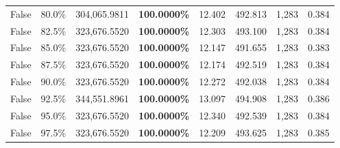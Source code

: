 \begin{table}[H]
\begin{tabular}{lllrllll}
\cline{1-8}
False & 80.0\% & \color{red} 304,065.9811 & \bfseries \color{red} 100.0000\% & 12.402 & 492.813 & 1,283 & 0.384 \\
\cline{1-8}
False & 82.5\% & 323,676.5520 & \bfseries \color{red} 100.0000\% & 12.303 & 493.100 & 1,283 & 0.384 \\
\cline{1-8}
False & 85.0\% & 323,676.5520 & \bfseries \color{red} 100.0000\% & 12.147 & 491.655 & 1,283 & 0.383 \\
\cline{1-8}
False & 87.5\% & 323,676.5520 & \bfseries \color{red} 100.0000\% & 12.174 & 492.519 & 1,283 & 0.384 \\
\cline{1-8}
False & 90.0\% & 323,676.5520 & \bfseries \color{red} 100.0000\% & 12.272 & 492.038 & 1,283 & 0.384 \\
\cline{1-8}
False & 92.5\% & 344,551.8961 & \bfseries \color{red} 100.0000\% & 13.097 & 494.908 & 1,283 & 0.386 \\
\cline{1-8}
False & 95.0\% & 323,676.5520 & \bfseries \color{red} 100.0000\% & 12.340 & 492.539 & 1,283 & 0.384 \\
\cline{1-8}
False & 97.5\% & 323,676.5520 & \bfseries \color{red} 100.0000\% & 12.209 & 493.625 & 1,283 & 0.385 \\
\cline{1-8}
\bottomrule
\end{tabular}
\end{table}
